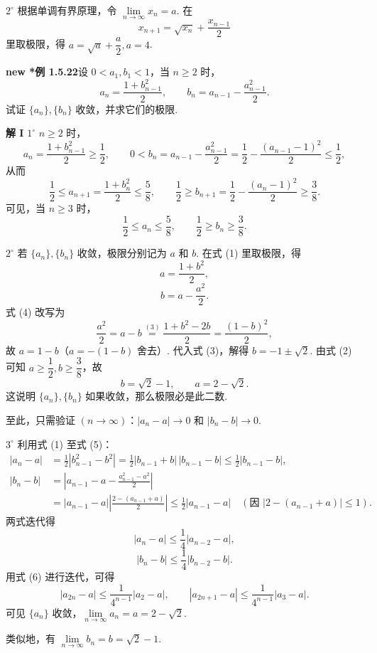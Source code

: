 \documentclass[UTF8,12pt,a4paper,fontset=fandol]{ctexart}
\begin{document}
$2^\circ$ 根据单调有界原理，令 $\lim\limits_{n\to\infty}x_n=a$. 在
\[
  x_{n+1}=\sqrt{x_n}+\frac{x_{n-1}}2
\]
里取极限，得 $a=\sqrt a+\dfrac a2,a=4$.

\noindent\textbf{new *例 1.5.22}\quad 设 $0<a_1,b_1<1$，当 $n\ge 2$ 时，
\[
  a_n=\frac{1+b_{n-1}^2}{2},\qquad
  b_n=a_{n-1}-\frac{a_{n-1}^2}{2}.
\tag{1}
\]
试证 $\{a_n\},\{b_n\}$ 收敛，并求它们的极限.

\noindent\textbf{解 I}\quad
$1^\circ$ $n\ge 2$ 时，
\[
  a_n=\frac{1+b_{n-1}^2}{2}\ge \frac12,\qquad
  0<b_n=a_{n-1}-\frac{a_{n-1}^2}{2}
  =\frac12-\frac{(a_{n-1}-1)^2}{2}\le \frac12,
\]
从而
\[
  \frac12\le a_{n+1}=\frac{1+b_n^2}{2}\le \frac58,\qquad
  \frac12\ge b_{n+1}=\frac12-\frac{(a_n-1)^2}{2}\ge \frac38.
\]
可见，当 $n\ge 3$ 时，
\[
  \frac12\le a_n\le \frac58,\qquad \frac12\ge b_n\ge \frac38.
\tag{2}
\]

$2^\circ$ 若 $\{a_n\},\{b_n\}$ 收敛，极限分别记为 $a$ 和 $b$. 在式 (1) 里取极限，得
\[
  a=\frac{1+b^2}{2},
\tag{3}
\]
\[
  b=a-\frac{a^2}{2}.
\tag{4}
\]
式 (4) 改写为
\[
  \frac{a^2}{2}=a-b\stackrel{(3)}{=}
  \frac{1+b^2-2b}{2}
  =\frac{(1-b)^2}{2},
\]
故 $a=1-b$（$a=-(1-b)$ 舍去）. 代入式 (3)，解得 $b=-1\pm\sqrt2$. 由式 (2) 可知 $a\ge \dfrac12,b\ge \dfrac38$，故
\[
  b=\sqrt2-1,\qquad a=2-\sqrt2.
\tag{5}
\]
这说明 $\{a_n\},\{b_n\}$ 如果收敛，那么极限必是此二数.

至此，只需验证 $(n\to\infty)$：$|a_n-a|\to 0$ 和 $|b_n-b|\to 0$.

$3^\circ$ 利用式 (1) 至式 (5)：
\[
\begin{aligned}
  |a_n-a|
  &=\frac12|b_{n-1}^2-b^2|
   =\frac12|b_{n-1}+b|\,|b_{n-1}-b|
   \le \frac12|b_{n-1}-b|,\\
  |b_n-b|
  &=\left|a_{n-1}-a-\frac{a_{n-1}^2-a^2}{2}\right|\\
  &=|a_{n-1}-a|
    \left|\frac{2-(a_{n-1}+a)}2\right|
   \le \frac12|a_{n-1}-a|
  \quad (\text{因 }|2-(a_{n-1}+a)|\le 1).
\end{aligned}
\]
两式迭代得
\[
  |a_n-a|\le \frac14 |a_{n-2}-a|,
\tag{6}
\]
\[
  |b_n-b|\le \frac14 |b_{n-2}-b|.
\tag{7}
\]
用式 (6) 进行迭代，可得
\[
  |a_{2n}-a|\le \frac1{4^{n-1}}|a_2-a|,\qquad
  |a_{2n+1}-a|\le \frac1{4^{n-1}}|a_3-a|.
\]
可见 $\{a_n\}$ 收敛，$\lim\limits_{n\to\infty}a_n=a=2-\sqrt2$.

类似地，有 $\lim\limits_{n\to\infty}b_n=b=\sqrt2-1$.
\end{document}
